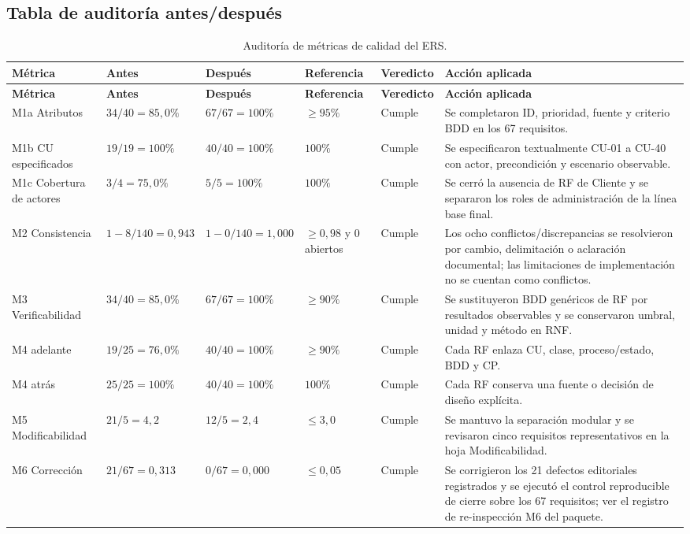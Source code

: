 \subsection{Tabla de auditoría antes/después}
\scriptsize
\begin{longtable}{|p{2.2cm}|p{2.5cm}|p{2.5cm}|p{1.9cm}|p{1.5cm}|p{4.1cm}|}
\caption{Auditoría de métricas de calidad del ERS.}\\
\hline\textbf{Métrica} & \textbf{Antes} & \textbf{Después} & \textbf{Referencia} & \textbf{Veredicto} & \textbf{Acción aplicada}\\\hline
\endfirsthead
\hline\textbf{Métrica} & \textbf{Antes} & \textbf{Después} & \textbf{Referencia} & \textbf{Veredicto} & \textbf{Acción aplicada}\\\hline
\endhead
M1a Atributos & $34/40=85,0\%$ & $67/67=100\%$ & $\geq95\%$ & Cumple & Se completaron ID, prioridad, fuente y criterio BDD en los 67 requisitos.\\\hline
M1b CU especificados & $19/19=100\%$ & $40/40=100\%$ & $100\%$ & Cumple & Se especificaron textualmente CU-01 a CU-40 con actor, precondición y escenario observable.\\\hline
M1c Cobertura de actores & $3/4=75,0\%$ & $5/5=100\%$ & $100\%$ & Cumple & Se cerró la ausencia de RF de Cliente y se separaron los roles de administración de la línea base final.\\\hline
M2 Consistencia & $1-8/140=0,943$ & $1-0/140=1,000$ & $\geq0,98$ y 0 abiertos & Cumple & Los ocho conflictos/discrepancias se resolvieron por cambio, delimitación o aclaración documental; las limitaciones de implementación no se cuentan como conflictos.\\\hline
M3 Verificabilidad & $34/40=85,0\%$ & $67/67=100\%$ & $\geq90\%$ & Cumple & Se sustituyeron BDD genéricos de RF por resultados observables y se conservaron umbral, unidad y método en RNF.\\\hline
M4 adelante & $19/25=76,0\%$ & $40/40=100\%$ & $\geq90\%$ & Cumple & Cada RF enlaza CU, clase, proceso/estado, BDD y CP.\\\hline
M4 atrás & $25/25=100\%$ & $40/40=100\%$ & $100\%$ & Cumple & Cada RF conserva una fuente o decisión de diseño explícita.\\\hline
M5 Modificabilidad & $21/5=4,2$ & $12/5=2,4$ & $\leq3,0$ & Cumple & Se mantuvo la separación modular y se revisaron cinco requisitos representativos en la hoja Modificabilidad.\\\hline
M6 Corrección & $21/67=0,313$ & $0/67=0,000$ & $\leq0,05$ & Cumple & Se corrigieron los 21 defectos editoriales registrados y se ejecutó el control reproducible de cierre sobre los 67 requisitos; ver el registro de re-inspección M6 del paquete.\\\hline
\end{longtable}
\normalsize

